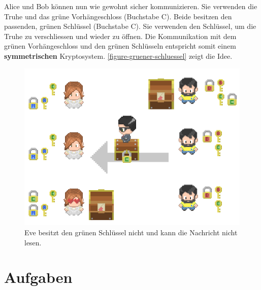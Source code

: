 Alice und Bob können nun wie gewohnt sicher kommunizieren. Sie verwenden die Truhe und das grüne Vorhängeschloss (Buchstabe C). Beide besitzen den passenden, grünen Schlüssel (Buchstabe C). Sie verwenden den Schlüssel, um die Truhe zu verschliessen und wieder zu öffnen. Die Kommunikation mit dem grünen Vorhängeschloss und den grünen Schlüsseln entspricht somit einem \textbf{symmetrischen} Kryptosystem. \autoref{figure-gruener-schluessel} zeigt die Idee.

\begin{figure}[htb]
	\centering
	\includegraphics[scale=0.55]{schluesselverteilung_truhe_2}
	\caption{Eve besitzt den grünen Schlüssel nicht und kann die Nachricht nicht lesen.}
	\label{figure-gruener-schluessel}
\end{figure}

\section{Aufgaben}

